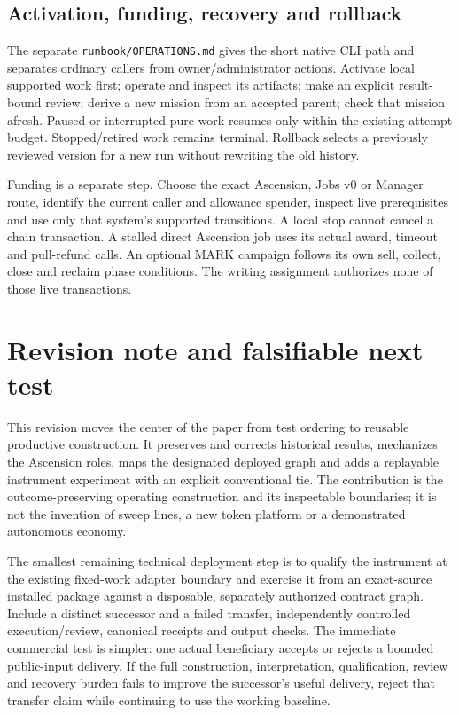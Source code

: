 \documentclass[11pt,letterpaper]{article}
\begin{document}
\subsection{Activation, funding, recovery and rollback}
The separate \texttt{runbook/\allowbreak{}OPERATIONS.\allowbreak{}md} gives the short native CLI path and separates ordinary callers from owner/administrator actions. Activate local supported work first; operate and inspect its artifacts; make an explicit result-bound review; derive a new mission from an accepted parent; check that mission afresh. Paused or interrupted pure work resumes only within the existing attempt budget. Stopped/retired work remains terminal. Rollback selects a previously reviewed version for a new run without rewriting the old history.

Funding is a separate step. Choose the exact Ascension, Jobs v0 or Manager route, identify the current caller and allowance spender, inspect live prerequisites and use only that system's supported transitions. A local stop cannot cancel a chain transaction. A stalled direct Ascension job uses its actual award, timeout and pull-refund calls. An optional MARK campaign follows its own sell, collect, close and reclaim phase conditions. The writing assignment authorizes none of those live transactions.

\section{Revision note and falsifiable next test}
This revision moves the center of the paper from test ordering to reusable productive construction. It preserves and corrects historical results, mechanizes the Ascension roles, maps the designated deployed graph and adds a replayable instrument experiment with an explicit conventional tie. The contribution is the outcome-preserving operating construction and its inspectable boundaries; it is not the invention of sweep lines, a new token platform or a demonstrated autonomous economy.

The smallest remaining technical deployment step is to qualify the instrument at the existing fixed-work adapter boundary and exercise it from an exact-source installed package against a disposable, separately authorized contract graph. Include a distinct successor and a failed transfer, independently controlled execution/review, canonical receipts and output checks. The immediate commercial test is simpler: one actual beneficiary accepts or rejects a bounded public-input delivery. If the full construction, interpretation, qualification, review and recovery burden fails to improve the successor's useful delivery, reject that transfer claim while continuing to use the working baseline.
\end{document}
